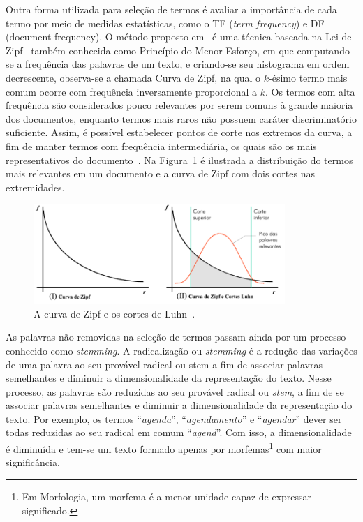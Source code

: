Outra forma utilizada para seleção de termos é avaliar a importância de cada termo por meio de medidas estatísticas, como o TF (\textit{term frequency}) e DF (document frequency). O método proposto em~\cite{Luhn1958} é uma técnica baseada na Lei de Zipf~\cite{zipf1932} também conhecida como Princípio do Menor Esforço, em que computando-se a frequência das palavras de um texto, e criando-se seu histograma em ordem decrescente, observa-se a chamada Curva de Zipf, na qual o $k$-ésimo termo mais comum ocorre com frequência inversamente proporcional a $k$. Os termos com alta frequência são considerados pouco relevantes por serem comuns à grande maioria dos documentos, enquanto termos mais raros não possuem caráter discriminatório suficiente. Assim, é possível estabelecer pontos de corte nos extremos da curva, a fim de manter termos com frequência intermediária, os quais são os mais representativos do documento~\cite{Maracini2010}. Na Figura~\ref{fig:luhn} é ilustrada a distribuição do termos mais relevantes em um documento e a curva de Zipf com dois cortes nas extremidades.


  \begin{figure}[!h]
	  \centering
	  \includegraphics[width=0.85\textwidth]{conteudo/capitulos/figs/luhn2.png}
	  \caption{A curva de Zipf e os cortes de Luhn~\cite{Soares2008}.}
	  \label{fig:luhn}
  \end{figure}



As palavras não removidas na seleção de termos passam ainda por um processo conhecido como \textit{stemming}.
A radicalização ou \textit{stemming} é a redução das variações de uma palavra ao seu provável radical ou stem a fim de associar palavras semelhantes e diminuir a dimensionalidade da representação do texto.
Nesse processo, as palavras são reduzidas ao seu provável radical ou \textit{stem}, a fim de se associar palavras semelhantes e diminuir a dimensionalidade da representação do texto. Por exemplo, os termos ``\textit{agenda}'', ``\textit{agendamento}'' e ``\textit{agendar}'' dever ser todas reduzidas ao seu radical em comum ``\textit{agend}''. Com isso, a dimensionalidade é diminuída e tem-se um texto formado apenas por morfemas\footnote{Em Morfologia, um morfema é a menor unidade capaz de expressar significado.} com maior significância.  
% 
%

